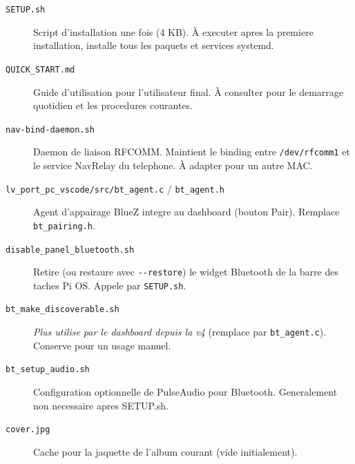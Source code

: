 \documentclass[a4paper,11pt]{article}
\begin{document}
\begin{description}
  \item[\texttt{SETUP.sh}]
    Script d'installation une fois (4 KB). À executer apres la premiere installation,
    installe tous les paquets et services systemd.
  \item[\texttt{QUICK\_START.md}]
    Guide d'utilisation pour l'utilisateur final. À consulter pour le demarrage
    quotidien et les procedures courantes.
  \item[\texttt{nav-bind-daemon.sh}]
    Daemon de liaison RFCOMM. Maintient le binding entre \texttt{/dev/rfcomm1} et
    le service NavRelay du telephone. À adapter pour un autre MAC.
  \item[\texttt{lv\_port\_pc\_vscode/src/bt\_agent.c} / \texttt{bt\_agent.h}]
    Agent d'appairage BlueZ integre au dashboard (bouton Pair). Remplace \texttt{bt\_pairing.h}.
  \item[\texttt{disable\_panel\_bluetooth.sh}]
    Retire (ou restaure avec \texttt{-{}-restore}) le widget Bluetooth de la barre des taches
    Pi OS. Appele par \texttt{SETUP.sh}.
  \item[\texttt{bt\_make\_discoverable.sh}]
    \emph{Plus utilise par le dashboard depuis la v4} (remplace par \texttt{bt\_agent.c}).
    Conserve pour un usage manuel.
  \item[\texttt{bt\_setup\_audio.sh}]
    Configuration optionnelle de PulseAudio pour Bluetooth. Generalement non necessaire
    apres SETUP.sh.
  \item[\texttt{cover.jpg}]
    Cache pour la jaquette de l'album courant (vide initialement).
\end{description}
\end{document}

